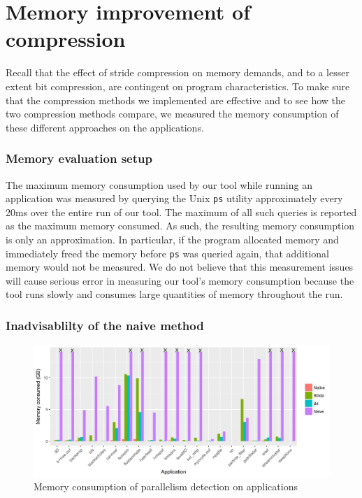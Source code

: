 \documentclass[12pt,twoside]{reedthesis}
\begin{document}
	\section{Memory improvement of compression}
		
		Recall that the effect of stride compression on memory demands, and to a lesser extent bit compression, are contingent on program characteristics. To make sure that the compression methods we implemented are effective and to see how the two compression methods compare, we measured the memory consumption of these different approaches on the applications. 
		
		\subsubsection{Memory evaluation setup}
		
		The maximum memory consumption used by our tool while running an application was measured by querying the Unix \texttt{ps} utility approximately every 20ms over the entire run of our tool. The maximum of all such queries is reported as the maximum memory consumed. As such, the resulting memory consumption is only an approximation. In particular, if the program allocated memory and immediately freed the memory before \texttt{ps} was queried again, that additional memory would not be measured. We do not believe that this measurement issues will cause serious error in measuring our tool's memory consumption because the tool runs slowly and consumes large quantities of memory throughout the run. %
		
		\subsubsection{Inadvisablilty of the naive method}
		
		
		\begin{figure}
			\caption{Memory consumption of parallelism detection on applications}
			\label{fig:mem-comp-plot}
			\includegraphics[scale=0.65]{plots/overall_plot.png}
		\end{figure}
		
\end{document}
